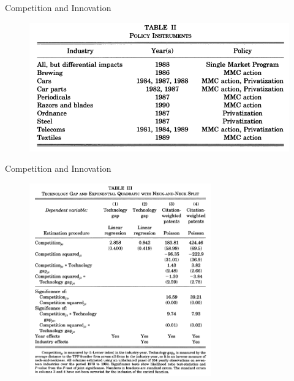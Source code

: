 \documentclass{beamer}
\begin{document}
\begin{frame}{Competition and Innovation}{}
\begin{figure}[h]
\begin{centering}
  \includegraphics[width=\textwidth]{0204}
   \label{fig:0204}
\end{centering}
\end{figure}
\end{frame}

\begin{frame}{Competition and Innovation}{}
\begin{figure}[h]
\begin{centering}
  \includegraphics[width=0.7\textwidth]{0205}
   \label{fig:0205}
\end{centering}
\end{figure}
\end{frame}
\end{document}
